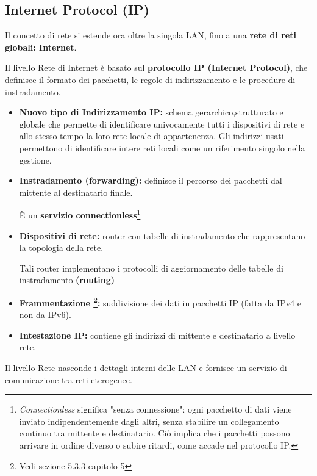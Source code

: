 \documentclass[a4paper,12pt]{report}
\begin{document}
\subsection{Internet Protocol (IP)}

Il concetto di rete si estende ora oltre la singola LAN, fino a una \textbf{rete di reti globali: Internet}.  

Il livello Rete di Internet è basato sul \textbf{protocollo IP (Internet Protocol)}, che definisce il formato dei pacchetti, le regole di indirizzamento e le procedure di instradamento.

\begin{itemize}
    \item \textbf{Nuovo tipo di Indirizzamento IP:} schema gerarchico,strutturato e globale che permette di identificare univocamente tutti i dispositivi di rete e allo stesso tempo la loro rete locale di appartenenza. Gli indirizzi usati permettono di identificare intere reti locali come un riferimento singolo nella gestione.
    \item \textbf{Instradamento (forwarding):} definisce il percorso dei pacchetti dal mittente al destinatario finale.
    
    È un \textbf{servizio connectionless}\footnote{\textit{Connectionless} significa "senza connessione": ogni pacchetto di dati viene inviato indipendentemente dagli altri, senza stabilire un collegamento continuo tra mittente e destinatario. Ciò implica che i pacchetti possono arrivare in ordine diverso o subire ritardi, come accade nel protocollo IP.}

    \item \textbf{Dispositivi di rete:} router con tabelle di instradamento che rappresentano la topologia della rete. 
    
    Tali router implementano i protocolli di aggiornamento delle tabelle di instradamento \textbf{(routing)}
    \item \textbf{Frammentazione \footnote{Vedi sezione 5.3.3 capitolo 5}:} suddivisione dei dati in pacchetti IP (fatta da IPv4  e non da IPv6).
    \item \textbf{Intestazione IP:} contiene gli indirizzi di mittente e destinatario a livello rete.
\end{itemize}

\begin{notebox}{}
Il livello Rete nasconde i dettagli interni delle LAN e fornisce un servizio di comunicazione tra reti eterogenee.
\end{notebox}
\end{document}
